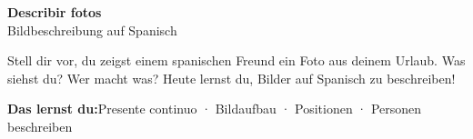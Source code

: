 \documentclass[10pt, a4paper]{article}
\newcommand{\thema}{Describir fotos}
\newcommand{\untertitel}{Bildbeschreibung auf Spanisch}
\newcommand{\lernziele}{Presente continuo · Bildaufbau · Positionen · Personen beschreiben}
\begin{document}
\begin{center}
    {\LARGE\bfseries \thema}\\[2pt]
    {\small \untertitel}
\end{center}

\vspace{2pt}

Stell dir vor, du zeigst einem spanischen Freund ein Foto aus deinem Urlaub.
Was siehst du? Wer macht was? Heute lernst du, Bilder auf Spanisch zu beschreiben!

\vspace{2pt}

\begin{lernzielbox}
\textbf{Das lernst du:}\quad \lernziele
\end{lernzielbox}

\end{document}
